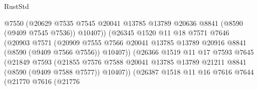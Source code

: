 \begin{lexlean}{RustStd}
\begin{coremodule}
                                    @7550
                                    (@20629
                                      @7535
                                      @7545
                                      @20041
                                      @13785
                                      @13789
                                      @20636
                                      @8841
                                      (@8590 (@9409 @7545 @7536))
                                      @10407))
                                  (@26345
                                    @1520
                                    @11
                                    @18
                                    @7571
                                    @7646
                                    (@20903
                                      @7571
                                      (@20909
                                        @7555
                                        @7566
                                        @20041
                                        @13785
                                        @13789
                                        @20916
                                        @8841
                                        (@8590 (@9409 @7566 @7556))
                                        @10407))
                                    (@26366
                                      @1519
                                      @11
                                      @17
                                      @7593
                                      @7645
                                      (@21849
                                        @7593
                                        (@21855
                                          @7576
                                          @7588
                                          @20041
                                          @13785
                                          @13789
                                          @21211
                                          @8841
                                          (@8590 (@9409 @7588 @7577))
                                          @10407))
                                      (@26387
                                        @1518
                                        @11
                                        @16
                                        @7616
                                        @7644
                                        (@21770
                                          @7616
                                          (@21776

\end{coremodule}
\end{lexlean}
